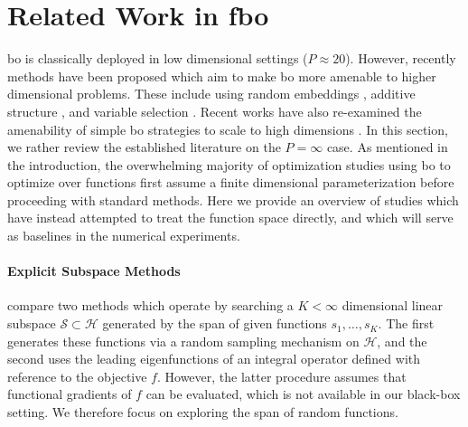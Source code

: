 \documentclass{article}
\newcommand{\Hs}{\mathcal{H}}
\begin{document}
\section{Related Work in \gls{fbo}}
\label{sec:related_work}

\gls{bo} is classically deployed in low dimensional settings ($P\approx 20$).
However, recently methods have been proposed which aim to make \gls{bo} more amenable to higher dimensional problems.
These include using random embeddings \citep{wang2016rembo,letham2020alebo,nayebi2019hesbo}, additive structure \citep{kandasamy2015additive,rolland2018additive,han2021tree}, and
variable selection \citep{papenmeier2022baxus,eriksson2021saasbo}.
Recent works have also re-examined the amenability of simple \gls{bo} strategies to scale to high dimensions \citep{hvarfner2024vanilla,doumont2025we}.
In this section, we rather review the established literature on the $P=\infty$ case.
As mentioned in the introduction, the overwhelming majority of optimization studies using \gls{bo} to optimize over functions first assume a finite dimensional parameterization before proceeding with standard methods.
Here we provide an overview of studies which have instead attempted to treat the function space directly, and which will serve as baselines in the numerical experiments.


\paragraph{Explicit Subspace Methods}
\cite{kundu2025active} compare two methods which operate by searching a $K<\infty$ dimensional linear subspace $\mathcal{S}\subset\Hs$ generated by the span of given functions $s_1, \ldots, s_K$.
The first generates these functions via a random sampling mechanism on $\Hs$, and the second uses the leading eigenfunctions of an integral operator defined with reference to the objective $f$.
However, the latter procedure assumes that functional gradients of $f$ can be evaluated, which is not available in our black-box setting.
We therefore focus on exploring the span of random functions.
\end{document}
